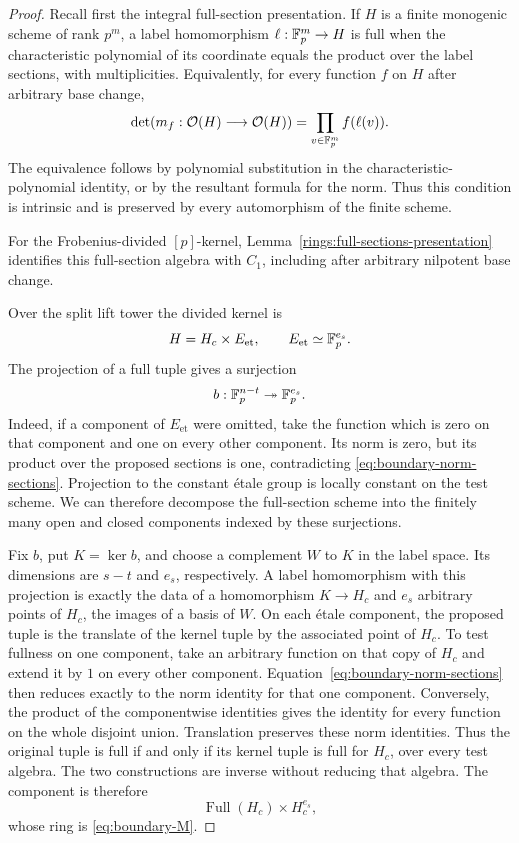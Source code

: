 \begin{proof}
Recall first the integral full-section presentation.  If $H$ is a
finite monogenic scheme of rank $p^m$, a label homomorphism
$\ell:\mathbb F_p^m\to H$ is full when the characteristic polynomial of its
coordinate equals the product over the label sections, with
multiplicities.  Equivalently, for every function $f$ on $H$ after
arbitrary base change,
\begin{equation}
 \label{eq:boundary-norm-sections}
 \det(m_f:\mathcal O(H)\longrightarrow\mathcal O(H))
       =\prod_{v\in\mathbb F_p^m} f(\ell(v)).
\end{equation}
The equivalence follows by polynomial substitution in the
characteristic-polynomial identity, or by the resultant formula for
the norm.  Thus this condition is intrinsic and is preserved by
every automorphism of the finite scheme.

For the Frobenius-divided $[p]$-kernel,
Lemma~\ref{rings:full-sections-presentation} identifies this
full-section algebra with $C_1$, including after arbitrary
nilpotent base change.

Over the split lift tower the divided kernel is
\[
 H=H_c\times E_{\mathrm{et}},
 \qquad E_{\mathrm{et}}\simeq\mathbb F_p^{e_s}.
\]
The projection of a full tuple gives a surjection
\[
 b:\mathbb F_p^{n-t}\twoheadrightarrow\mathbb F_p^{e_s}.
\]
Indeed, if a component of $E_{\mathrm{et}}$ were omitted, take the
function which is zero on that component and one on every other
component.  Its norm is zero, but its product over the proposed
sections is one, contradicting \eqref{eq:boundary-norm-sections}.
Projection to the constant \'etale group is locally constant on the
test scheme.  We can therefore decompose the full-section scheme
into the finitely many open and closed components indexed by these
surjections.

Fix $b$, put $K=\ker b$, and choose a complement $W$ to $K$ in the
label space.  Its dimensions are $s-t$ and $e_s$, respectively.  A
label homomorphism with this projection is exactly the data of a
homomorphism $K\to H_c$ and $e_s$ arbitrary points of $H_c$, the
images of a basis of $W$.  On each \'etale component, the proposed
tuple is the translate of the kernel tuple by the associated point
of $H_c$. To test fullness on one component, take an arbitrary
function on that copy of $H_c$ and extend it by $1$ on every other
component. Equation~\eqref{eq:boundary-norm-sections} then reduces
exactly to the norm identity for that one component. Conversely,
the product of the componentwise identities gives the identity for
every function on the whole disjoint union. Translation preserves
these norm identities. Thus the original tuple is full if and only
if its kernel tuple is full for $H_c$, over every test algebra.
The two constructions are inverse without reducing that algebra.
The component is therefore
\[
 \operatorname{Full}(H_c)\times H_c^{e_s},
\]
whose ring is \eqref{eq:boundary-M}.


\end{proof}
